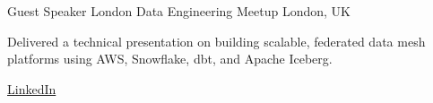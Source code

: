 
\begin{cventries}

  \cventry
  {Guest Speaker} %
  {London Data Engineering Meetup} %
  {London, UK} %
  {} %
  {
    \begin{cvitems}
    \item {Delivered a technical presentation on building scalable, federated data mesh platforms using AWS, Snowflake, dbt, and Apache Iceberg.}
    \item {\href{https://www.linkedin.com/posts/nathan-purvis_had-a-fantastic-time-hosting-the-data-engineer-ugcPost-7310304633413877762-_GgX?utm_source=share\&utm_medium=member_desktop\&rcm=ACoAABOiP7MBNzcJ-30o75SZFf2lYAaRuiz0fmc}{LinkedIn}}
    \end{cvitems}
  }

\end{cventries}
